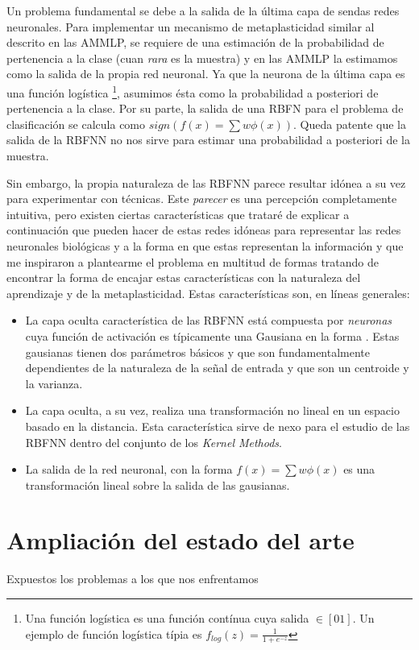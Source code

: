 \documentclass[10pt,a4paper]{report}
\begin{document}
Un problema fundamental se debe a la salida de la última capa de sendas redes neuronales. Para implementar un mecanismo de metaplasticidad similar al descrito en las AMMLP, se requiere de una estimación de la probabilidad de pertenencia a la clase (cuan \textit{rara} es la muestra) y en las AMMLP la estimamos como la salida de la propia red neuronal. Ya que la neurona de la última capa es una función logística \footnote{Una función logística es una función contínua cuya salida $\in [0 1]$. Un ejemplo de función logística típia es $f_{log}(z)=\frac{1}{1+e^{-z}}$}, asumimos ésta como la probabilidad a posteriori de pertenencia a la clase. Por su parte, la salida de una RBFN para el problema de clasificación se calcula como $sign(f(x)=\sum w \phi(x))$. Queda patente que la salida de la RBFNN no nos sirve para estimar una probabilidad a posteriori de la muestra.

Sin embargo, la propia naturaleza de las RBFNN parece resultar idónea a su vez para experimentar con técnicas. Este \textit{parecer} es una percepción completamente intuitiva, pero existen ciertas características que trataré de explicar a continuación que pueden hacer de estas redes idóneas para representar las redes neuronales biológicas y a la forma en que estas representan la información y que me inspiraron a plantearme el problema en multitud de formas tratando de encontrar la forma de encajar estas características con la naturaleza del aprendizaje y de la metaplasticidad. Estas características son, en líneas generales:
\begin{itemize}
	\item La capa oculta característica de las RBFNN está compuesta por \textit{neuronas} cuya función de activación es típicamente una Gausiana en la forma . Estas gausianas tienen dos parámetros básicos y que son fundamentalmente dependientes de la naturaleza de la señal de entrada y que son un centroide y la varianza.
	\item La capa oculta, a su vez, realiza una transformación no lineal en un espacio basado en la distancia. Esta característica sirve de nexo para el estudio de las RBFNN dentro del conjunto de los \textit{Kernel Methods}.
	\item La salida de la red neuronal, con la forma $f(x)=\sum w \phi(x)$ es una transformación lineal sobre la salida de las gausianas. 
\end{itemize}


\section{Ampliación del estado del arte}
Expuestos los problemas a los que nos enfrentamos
\end{document}
